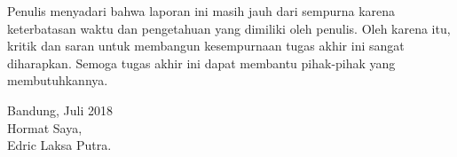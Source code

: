 Penulis menyadari bahwa laporan ini masih jauh dari sempurna karena keterbatasan waktu dan pengetahuan yang dimiliki oleh penulis. Oleh karena itu, kritik dan saran untuk membangun kesempurnaan tugas akhir ini sangat diharapkan. Semoga tugas akhir ini dapat membantu pihak-pihak yang membutuhkannya.\\[0.5cm]  
\hfill
{\begin{flushright} Bandung, Juli 2018\\[1.0cm] Hormat  Saya,\\ Edric Laksa Putra.\end{flushright}}
\newpage
